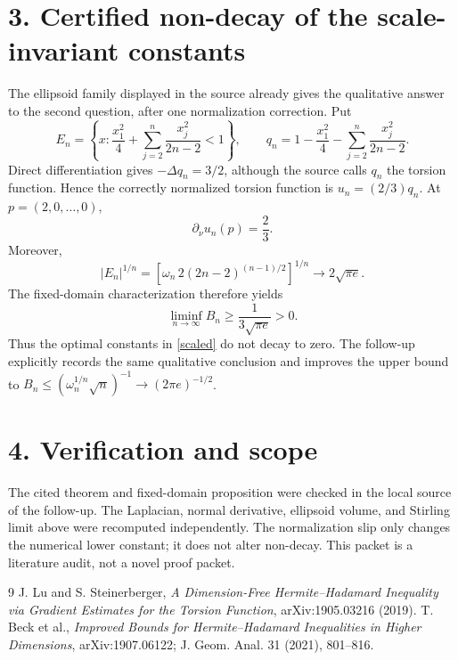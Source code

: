 \documentclass[11pt]{article}
\begin{document}
\section*{3. Certified non-decay of the scale-invariant constants}
The ellipsoid family displayed in the source already gives the qualitative
answer to the second question, after one normalization correction.  Put
\[
 E_n=\left\{x:\frac{x_1^2}{4}+
 \sum_{j=2}^n\frac{x_j^2}{2n-2}<1\right\},\qquad
 q_n=1-\frac{x_1^2}{4}-\sum_{j=2}^n\frac{x_j^2}{2n-2}.
\]
Direct differentiation gives $-\Delta q_n=3/2$, although the source calls
$q_n$ the torsion function.  Hence the correctly normalized torsion function
is $u_n=(2/3)q_n$.  At $p=(2,0,\ldots,0)$,
\[
 \partial_\nu u_n(p)=\frac23.
\]
Moreover,
\[
 |E_n|^{1/n}
 =\left[\omega_n\,2(2n-2)^{(n-1)/2}\right]^{1/n}
 \longrightarrow 2\sqrt{\pi e}.
\]
The fixed-domain characterization therefore yields
\[
 \liminf_{n\to\infty}B_n\geq \frac{1}{3\sqrt{\pi e}}>0.
\]
Thus the optimal constants in \eqref{scaled} do not decay to zero.  The
follow-up explicitly records the same qualitative conclusion and improves the
upper bound to
$B_n\leq(\omega_n^{1/n}\sqrt n)^{-1}\to(2\pi e)^{-1/2}$.

\section*{4. Verification and scope}
The cited theorem and fixed-domain proposition were checked in the local
source of the follow-up.  The Laplacian, normal derivative, ellipsoid volume,
and Stirling limit above were recomputed independently.  The
normalization slip only changes the numerical lower constant; it does not
alter non-decay.  This packet is a literature audit, not a novel proof packet.

\begin{thebibliography}{9}
 J. Lu and S. Steinerberger,
\emph{A Dimension-Free Hermite--Hadamard Inequality via Gradient Estimates for
the Torsion Function}, arXiv:1905.03216 (2019).
 T. Beck et al.,
\emph{Improved Bounds for Hermite--Hadamard Inequalities in Higher Dimensions},
arXiv:1907.06122; J. Geom. Anal. 31 (2021), 801--816.
\end{thebibliography}
\end{document}
